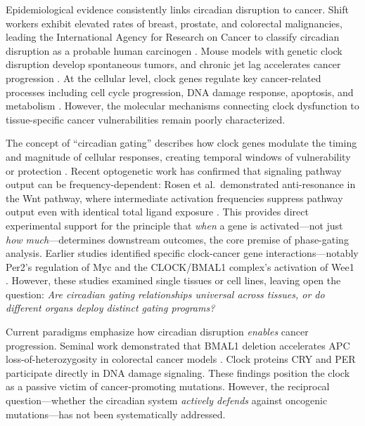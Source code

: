 \documentclass[11pt,a4paper]{article}
\begin{document}
Epidemiological evidence consistently links circadian disruption to cancer. Shift workers exhibit elevated rates of breast, prostate, and colorectal malignancies, leading the International Agency for Research on Cancer to classify circadian disruption as a probable human carcinogen \citep{straif2007, schernhammer2003night}. Mouse models with genetic clock disruption develop spontaneous tumors, and chronic jet lag accelerates cancer progression \citep{fu2002}. At the cellular level, clock genes regulate key cancer-related processes including cell cycle progression, DNA damage response, apoptosis, and metabolism \citep{matsuo2003, gery2006circadian, masri2015circadian}. However, the molecular mechanisms connecting clock dysfunction to tissue-specific cancer vulnerabilities remain poorly characterized.

The concept of ``circadian gating'' describes how clock genes modulate the timing and magnitude of cellular responses, creating temporal windows of vulnerability or protection \citep{janich2011}. Recent optogenetic work has confirmed that signaling pathway output can be frequency-dependent: Rosen et al.\ demonstrated anti-resonance in the Wnt pathway, where intermediate activation frequencies suppress pathway output even with identical total ligand exposure \citep{rosen2026}. This provides direct experimental support for the principle that \textit{when} a gene is activated---not just \textit{how much}---determines downstream outcomes, the core premise of phase-gating analysis. Earlier studies identified specific clock-cancer gene interactions---notably Per2's regulation of Myc \citep{fu2002} and the CLOCK/BMAL1 complex's activation of Wee1 \citep{matsuo2003}. However, these studies examined single tissues or cell lines, leaving open the question: \textit{Are circadian gating relationships universal across tissues, or do different organs deploy distinct gating programs?}

Current paradigms emphasize how circadian disruption \textit{enables} cancer progression. Seminal work demonstrated that BMAL1 deletion accelerates APC loss-of-heterozygosity in colorectal cancer models \citep{chun2022}. Clock proteins CRY and PER participate directly in DNA damage signaling. These findings position the clock as a passive victim of cancer-promoting mutations. However, the reciprocal question---whether the circadian system \textit{actively defends} against oncogenic mutations---has not been systematically addressed.
\end{document}
